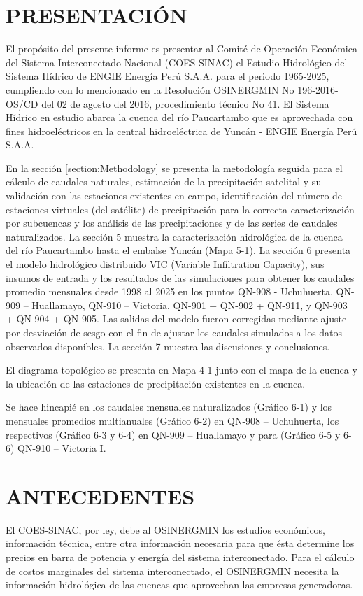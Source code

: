 \newpage
\section{PRESENTACIÓN}
El propósito del presente informe es presentar al Comité de Operación Económica del Sistema Interconectado Nacional (COES-SINAC) el Estudio Hidrológico del Sistema Hídrico de ENGIE Energía Perú S.A.A. para el periodo 1965-2025, cumpliendo con lo mencionado en la Resolución OSINERGMIN No 196-2016-OS/CD del 02 de agosto del 2016, procedimiento técnico No 41. El Sistema Hídrico en estudio abarca la cuenca del río Paucartambo que es aprovechada con fines hidroeléctricos en la central hidroeléctrica de Yuncán - ENGIE Energía Perú S.A.A.

En la sección \ref{section:Methodology} se presenta la metodología seguida para el cálculo de caudales naturales, estimación de la precipitación satelital y su validación con las estaciones existentes en campo, identificación del número de estaciones virtuales (del satélite) de precipitación para la correcta caracterización por subcuencas y los análisis de las precipitaciones y de las series de caudales naturalizados. La sección 5 muestra la caracterización hidrológica de la cuenca del río Paucartambo hasta el embalse Yuncán (Mapa 5-1). La sección 6 presenta el modelo hidrológico distribuido VIC (Variable Infiltration Capacity), sus insumos de entrada y los resultados de las simulaciones para obtener los caudales promedio mensuales desde 1998 al 2025 en los puntos QN-908 - Uchuhuerta, QN-909 – Huallamayo, QN-910 – Victoria, QN-901 + QN-902 + QN-911, y QN-903 + QN-904 + QN-905. Las salidas del modelo fueron corregidas mediante ajuste por desviación de sesgo con el fin de ajustar los caudales simulados a los datos observados disponibles. La sección 7 muestra las discusiones y conclusiones.

El diagrama topológico se presenta en Mapa 4-1 junto con el mapa de la cuenca y la ubicación de las estaciones de precipitación existentes en la cuenca.

Se hace hincapié en los caudales mensuales naturalizados (Gráfico 6-1) y los mensuales promedios multianuales (Gráfico 6-2) en QN-908 – Uchuhuerta, los respectivos (Gráfico 6-3 y 6-4) en QN-909 – Huallamayo y para (Gráfico 6-5 y 6-6) QN-910 – Victoria I.

\section{ANTECEDENTES}

El COES-SINAC, por ley, debe al OSINERGMIN los estudios económicos, información técnica, entre otra información necesaria para que ésta determine los precios en barra de potencia y energía del sistema interconectado. Para el cálculo de costos marginales del sistema interconectado, el OSINERGMIN necesita la información hidrológica de las cuencas que aprovechan las empresas generadoras.

